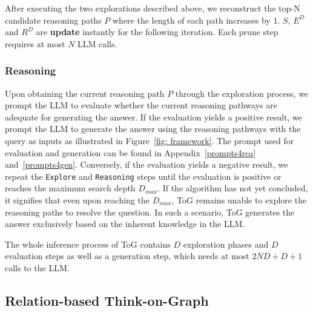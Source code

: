 \begin{itemize}[leftmargin=*]
\end{itemize}
After executing the two explorations described above, we reconstruct the top-N candidate reasoning paths $P$ where the length of each path increases by 1. $S$, $E^{D}$ and $R^{D}$ are \textbf{update} instantly for the following iteration. Each prune step requires at most $N$ LLM calls.
\subsubsection{Reasoning}
Upon obtaining the current reasoning path $P$ through the exploration process, we prompt the LLM to evaluate whether the current reasoning pathways are adequate for generating the answer. If the evaluation yields a positive result, we prompt the LLM to generate the answer using the reasoning pathways with the query as inputs as illustrated in Figure~\ref{fig: framework}. The prompt used for evaluation and generation can be found in Appendix~\ref{prompts4rea} and~\ref{prompts4gen}. Conversely, if the evaluation yields a negative result, we repeat the \texttt{Explore} and \texttt{Reasoning} steps until the evaluation is positive or reaches the maximum search depth $D_{max}$. If the algorithm has not yet concluded, it signifies that even upon reaching the $D_{max}$, ToG remains unable to explore the reasoning paths to resolve the question. In such a scenario, ToG generates the answer exclusively based on the inherent knowledge  in the LLM.

The whole inference process of ToG contains $D$ exploration phases and $D$ evaluation steps as well as a generation step, which needs at most $2ND+D+1$ calls to the LLM. 


\subsection{Relation-based Think-on-Graph}

